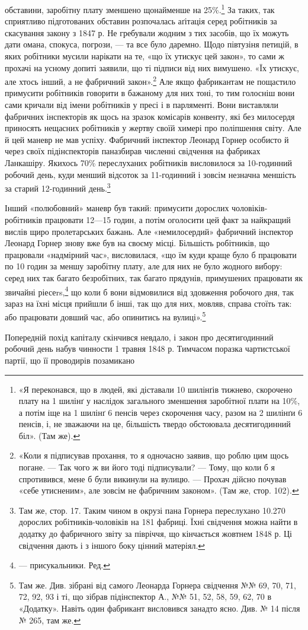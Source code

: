 \parcont{}  %
обставини, заробітну плату зменшено щонайменше на 25\%.\footnote{
«Я переконався, що в людей, які діставали 10 шилінґів тижнево,
скорочено плату на 1 шилінґ у наслідок загального зменшення заробітної
плати на 10\%, а потім іще на 1 шилінґ 6 пенсів через скорочення часу,
разом на 2 шилінґи 6 пенсів, і, не зважаючи на це, більшість твердо обстоювала
десятигодинний біл». (Там же).
}
За таких, так сприятливо підготованих обставин розпочалась
аґітація серед робітників за скасування закону з 1847 р. Не гребували
жодним з тих засобів, що їх можуть дати омана, спокуса,
погрози, — та все було даремно. Щодо півтузіня петицій, в яких
робітники мусили нарікати на те, «що їх утискує цей закон», то
сами ж прохачі на усному допиті заявили, що ті підписи від них
вимушено. «Їх утискує, але хтось інший, а не фабричний закон».\footnote{
«Коли я підписував прохання, то я одночасно заявив, що роблю
цим щось погане. — Так чого ж ви його тоді підписували? — Тому, що коли б
я спротивився, мене б були викинули на вулицю. — Прохач дійсно почував
«себе утисненим», але зовсім не фабричним законом». (Там же, стор. 102).
}
Але якщо фабрикантам не пощастило примусити робітників
говорити в бажаному для них тоні, то тим голосніш вони сами
кричали від імени робітників у пресі і в парляменті. Вони виставляли
фабричних інспекторів як щось на зразок комісарів конвенту,
які без милосердя приносять нещасних робітників у жертву
своїй химері про поліпшення світу. Але й цей маневр не мав
успіху. Фабричний інспектор Леонард Горнер особисто й через
своїх підінспекторів паназбирав численні свідчення на фабриках
Ланкашіру. Якихось 70\% переслуханих робітників висловилося
за 10-годинний робочий день, куди менший відсоток за 11-годинний
і зовсім незначна меншість за старий 12-годинний день.\footnote{
Там же, стор. 17. Таким чином в окрузі пана Горнера переслухано
10.270 дорослих робітників-чоловіків на 181 фабриці. Їхні свідчення
можна найти в додатку до фабричного звіту за півріччя, що кінчається
жовтнем 1848 р. Ці свідчення дають і з іншого боку цінний матеріял.
}

Інший «полюбовний» маневр був такий: примусити дорослих
чоловіків-робітників працювати 12—15 годин, а потім оголосити
цей факт за найкращий вислів щиро пролетарських бажань.
Але «немилосердий» фабричний інспектор Леонард Горнер знову
вже був на своєму місці. Більшість робітників, що працювали
«надмірний час», висловилася, «що їм куди краще було б працювати
по 10 годин за меншу заробітну плату, але для них не було
жодного вибору: серед них так багато безробітних, так багато
прядунів, примушених працювати як звичайні ріесеrs,\footnote*{
— присукальники. Ред.
} що
коли б вони відмовилися від здовження робочого дня, так зараз
на їхні місця прийшли б інші, так що для них, мовляв, справа
стоїть так: або працювати довший час, або опинитись на вулиці».\footnote{
Там же. Див. зібрані від самого Леонарда Горнера свідчення
№№ 69, 70, 71, 72, 92, 93 і ті, що зібрав підінспектор А., №№ 51, 52,
58, 59, 62, 70 в «Додатку». Навіть один фабрикант висловився занадто
ясно. Див. № 14 після № 265, там же.
}

Попередній похід капіталу скінчився невдало, і закон про десятигодинний
робочий день набув чинности 1 травня 1848 р. Тимчасом
поразка чартистської партії, що її проводирів позамикано
\parbreak{}  %
